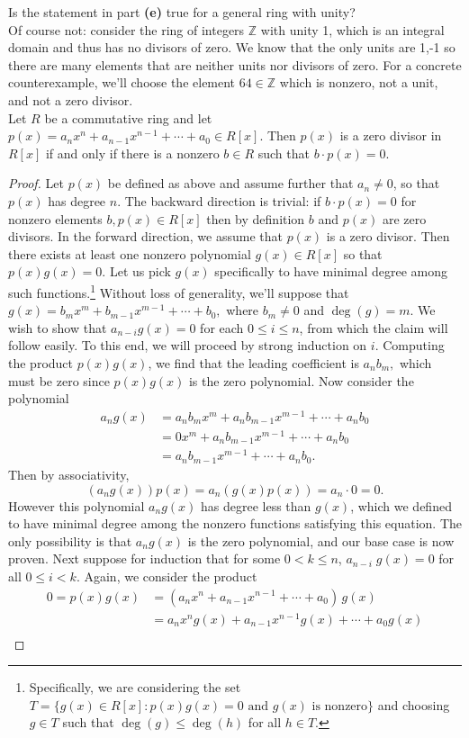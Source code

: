 \documentclass{article}
\newenvironment{problem2}[1]{\noindent {\bf (#1}}
{\medskip}
\newenvironment{problem1}[1]{\noindent {\bf Problem #1:}}
{\medskip}
\begin{document}
\begin{problem2}{f)} Is the statement in part \textbf{(e)} true for a general ring with unity?\\

Of course not: consider the ring of integers $\mathbb{Z}$ with unity 1, which is an integral domain and thus has no divisors of zero. We know that the only units are 1,-1 so there are many elements that are neither units nor divisors of zero. For a concrete counterexample, we'll choose the element $64\in\mathbb{Z}$ which is nonzero, not a unit, and not a zero divisor.
\end{problem2}\\


\begin{problem1}{4} Let $R$ be a commutative ring and let $p(x)=a_nx^n+a_{n-1}x^{n-1}+\cdots+a_0\in R[x]$. Then $p(x)$ is a zero divisor in $R[x]$ if and only if there is a nonzero $b\in R$ such that $b\cdot p(x)=0$.
\begin{proof} Let $p(x)$ be defined as above and assume further that $a_n\ne0$, so that $p(x)$ has degree $n$. The backward direction is trivial: if $b\cdot p(x)=0$ for nonzero elements $b,p(x)\in R[x]$ then by definition $b$ and $p(x)$ are zero divisors. In the forward direction, we assume that $p(x)$ is a zero divisor. Then there exists at least one nonzero polynomial $g(x)\in R[x]$ so that $p(x)g(x)=0$. Let us pick $g(x)$ specifically to have minimal degree among such functions.\footnote{Specifically, we are considering the set $T=\{g(x)\in R[x] : p(x)g(x)=0 \text{ and } g(x)\text{ is nonzero}\}$ and choosing $g\in T$ such that $\deg(g)\le\deg(h)$ for all $h\in T$.} Without loss of generality, we'll suppose that $g(x)=b_mx^m+b_{m-1}x^{m-1}+\cdots+b_0,$ where $b_m\ne 0$ and $\deg(g)=m$. We wish to show that $a_{n-i}g(x)=0$ for each $0\le i\le n$, from which the claim will follow easily. To this end, we will proceed by strong induction on $i$. Computing the product $p(x)g(x)$, we find that the leading coefficient is $a_nb_m,$ which must be zero since $p(x)g(x)$ is the zero polynomial. Now consider the polynomial \begin{align*}a_ng(x)&=a_nb_mx^m+a_nb_{m-1}x^{m-1}+\cdots+a_nb_0\\ &=0x^m+a_nb_{m-1}x^{m-1}+\cdots+a_nb_0\\ &=a_nb_{m-1}x^{m-1}+\cdots+a_nb_0.\end{align*} Then by associativity, $$(a_ng(x))p(x)=a_n(g(x)p(x))=a_n\cdot 0=0.$$ However this polynomial $a_ng(x)$ has degree less than $g(x)$, which we defined to have minimal degree among the nonzero functions satisfying this equation. The only possibility is that $a_ng(x)$ is the zero polynomial, and our base case is now proven. Next suppose for induction that for some $0<k\le n$,\; $a_{n-i}\;g(x)=0$ for all $0\le i < k$. Again, we consider the product \begin{align*} 0=p(x)g(x)&=(a_nx^n+a_{n-1}x^{n-1}+\cdots+a_0)\,g(x) \\ &= a_nx^n g(x)+a_{n-1}x^{n-1}g(x)+\cdots+a_0g(x) \\

\end{align*}
\end{proof}
\end{problem1}
\end{document}
